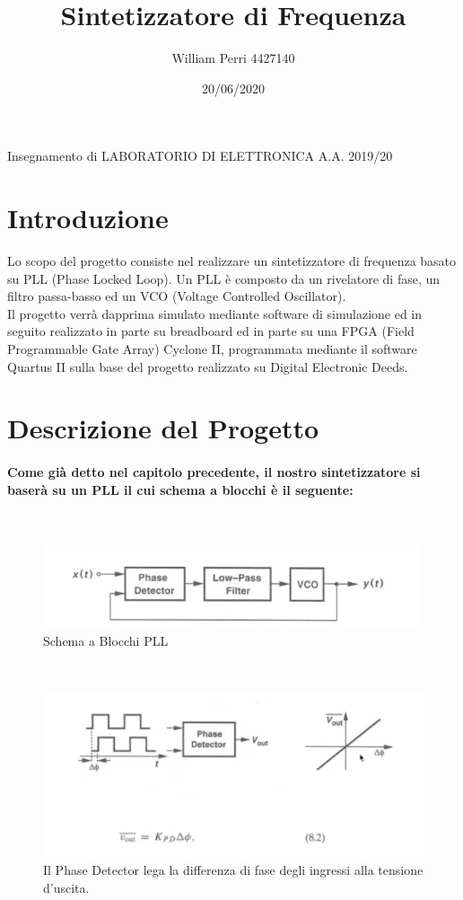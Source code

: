 \documentclass[a4paper]{article}
\title{Sintetizzatore di Frequenza}
\author{William Perri 4427140 }
\date{20/06/2020}
\begin{document}
\maketitle
Insegnamento di LABORATORIO DI ELETTRONICA A.A. 2019/20

\newpage
\tableofcontents
\newpage
\section{Introduzione}
Lo scopo del progetto consiste nel realizzare un sintetizzatore di frequenza basato su PLL (Phase Locked Loop).
Un PLL è composto da un rivelatore di fase, un filtro passa-basso ed un VCO (Voltage Controlled Oscillator).\\
 Il progetto verrà dapprima simulato mediante software di simulazione ed in seguito realizzato in parte su breadboard ed in parte su una FPGA (Field Programmable Gate Array) Cyclone II, programmata mediante il software Quartus II sulla base del progetto realizzato su Digital Electronic Deeds.


\newpage
\section{Descrizione del Progetto}

\paragraph{Come già detto nel capitolo precedente, il nostro sintetizzatore si baserà su un PLL il cui schema a blocchi è il seguente:\\ }

~\begin{figure}[H]%
\includegraphics[scale=1.4]{PLLSchema.png} 
\caption{Schema a Blocchi PLL}
\label{fig:foo}
\end{figure}
~\begin{figure}[H]%
\includegraphics[scale=1]{PhaseDetect.png} 
\caption{Il Phase Detector lega la differenza di fase degli ingressi alla tensione d'uscita.}
\label{fig:foo}
\end{figure}
\end{document}
